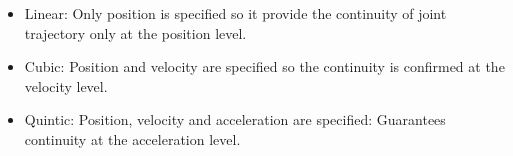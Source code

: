 \label{itemize jtc}
\begin{itemize}
    \item Linear: Only position is specified so it provide the continuity of joint trajectory only at the position level. 


    \item Cubic: Position and velocity are specified so the continuity is confirmed at the velocity level.


    \item Quintic: Position, velocity and acceleration are specified: Guarantees continuity at the acceleration level.

\end{itemize}

